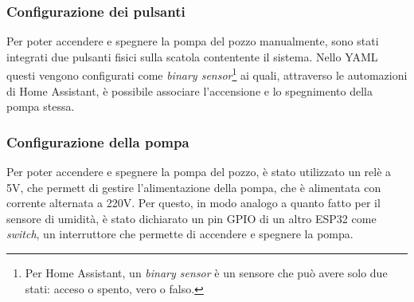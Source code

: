 \documentclass[11pt, a4paper]{article}
\begin{document}
\subsubsection{Configurazione dei pulsanti}
Per poter accendere e spegnere la pompa del pozzo manualmente, sono stati integrati due pulsanti fisici sulla
scatola contentente il sistema. Nello YAML questi vengono configurati come 
\textit{binary sensor}\footnote{Per Home Assistant, un \textit{binary sensor} è un sensore che può 
avere solo due stati: acceso o spento, vero o falso.}
ai quali, attraverso le automazioni di Home Assistant, è possibile associare l'accensione e lo spegnimento
della pompa stessa.

\subsubsection{Configurazione della pompa}
Per poter accendere e spegnere la pompa del pozzo, è stato utilizzato un relè a 5V, che permett di
gestire l'alimentazione della pompa, che è alimentata con corrente alternata a 220V.
Per questo, in modo analogo a quanto fatto per il sensore di umidità, è stato dichiarato un pin GPIO
di un altro ESP32 come \textit{switch}, un interruttore che permette di accendere e spegnere la pompa.
\end{document}
